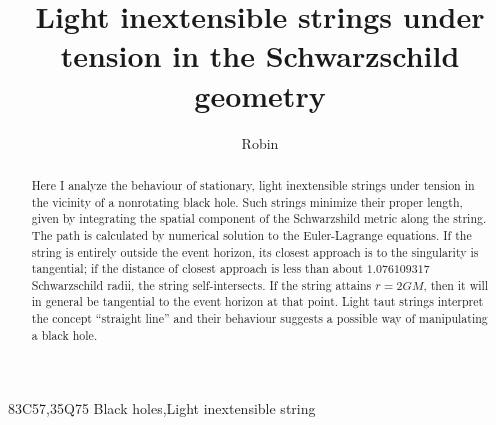 \documentclass[times,twocolumn,final]{elsarticle}
\begin{document}

\begin{frontmatter}

\title{Light inextensible strings under tension in the Schwarzschild geometry}

\author[1]{Robin }

\address[1]{Auckland University of Technology, 2-14 Wakefield Street,
  Auckland 1142, New Zealand}




\begin{abstract}
Here I analyze the behaviour of stationary, light inextensible strings
under tension in the vicinity of a nonrotating black hole.  Such
strings minimize their proper length, given by integrating the spatial
component of the Schwarzshild metric along the string.  The path is
calculated by numerical solution to the Euler-Lagrange equations.  If
the string is entirely outside the event horizon, its closest approach
is to the singularity is tangential; if the distance of closest
approach is less than about $1.076109317$ Schwarzschild radii, the
string self-intersects.  If the string attains $r=2GM$, then it will
in general be tangential to the event horizon at that point.  Light
taut strings interpret the concept ``straight line'' and their
behaviour suggests a possible way of manipulating a black hole.
\end{abstract}

\begin{keyword}
\MSC 83C57\sep 35Q75
\KWD Black holes\sep Light inextensible string
\end{keyword}

\end{frontmatter}


\end{document}
